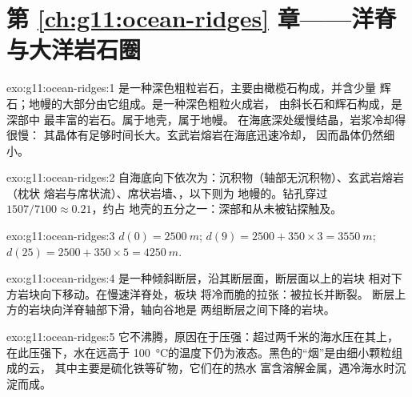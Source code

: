 \section*{第 \ref{ch:g11:ocean-ridges} 章——洋脊与大洋岩石圈}

\begin{solution}{exo:g11:ocean-ridges:1}
是一种深色粗粒岩石，主要由橄榄石构成，并含少量
辉石；地幔的大部分由它组成。是一种深色粗粒火成岩，
由斜长石和辉石构成，是深部中
最丰富的岩石。属于地壳，属于地幔。
在海底深处缓慢结晶，岩浆冷却得很慢：
其晶体有足够时间长大。玄武岩熔岩在海底迅速冷却，
因而晶体仍然细小。
\end{solution}

\begin{solution}{exo:g11:ocean-ridges:2}
自海底向下依次为：沉积物（轴部无沉积物）、玄武岩熔岩（枕状
熔岩与席状流）、席状岩墙、，以下则为
地幔的。钻孔穿过 $1507/7100 \approx 0.21$，约占
地壳的五分之一：深部和从未被钻探触及。
\end{solution}

\begin{solution}{exo:g11:ocean-ridges:3}
$d(0) = \qty{2500}{m}$; $d(9) = 2500 + 350 \times 3 = \qty{3550}{m}$;
$d(25) = 2500 + 350 \times 5 = \qty{4250}{m}$.
\end{solution}

\begin{solution}{exo:g11:ocean-ridges:4}
是一种倾斜断层，沿其断层面，断层面以上的岩块
相对下方岩块向下移动。在慢速洋脊处，板块
将冷而脆的拉张：被拉长并断裂。
断层上方的岩块向洋脊轴部下滑，轴向谷地是
两组断层之间下降的岩块。
\end{solution}

\begin{solution}{exo:g11:ocean-ridges:5}
它不沸腾，原因在于压强：超过两千米的海水压在其上，
在此压强下，水在远高于
\qty{100}{\celsius}的温度下仍为液态。黑色的“烟”是由细小颗粒组成的云，
其中主要是硫化铁等矿物，它们在的热水
富含溶解金属，遇冷海水时沉淀而成。
\end{solution}

